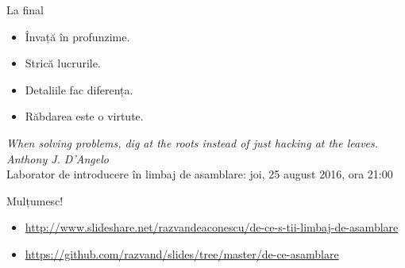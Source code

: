 \documentclass{simple}
\begin{document}
\begin{frame}{La final}
  \begin{itemize}
    \pause \item Învață în profunzime.
    \pause \item Strică lucrurile.
    \pause \item Detaliile fac diferența.
    \pause \item Răbdarea este o virtute.
  \end{itemize}
  \vspace{5mm}
  \centering
  \pause \textit{When solving problems, dig at the roots instead of just hacking at the leaves.} \\
  \vspace{3mm}
  \hfill \textit{Anthony J. D'Angelo} \\
  \vspace{5mm}
  \pause Laborator de introducere în limbaj de asamblare: joi, 25 august 2016, ora 21:00
\end{frame}

\begin{frame}{Mulțumesc!}
  \begin{itemize}
    \item \tiny{\url{http://www.slideshare.net/razvandeaconescu/de-ce-s-tii-limbaj-de-asamblare}}
    \item \tiny{\url{https://github.com/razvand/slides/tree/master/de-ce-asamblare}}
  \end{itemize}
\end{frame}
\end{document}
